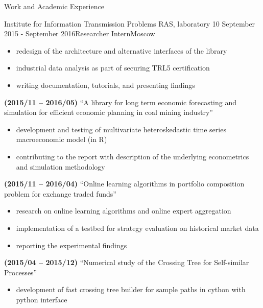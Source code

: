 \documentclass{resume} %
\begin{document}
\begin{rSection}{Work and Academic Experience}
\begin{rSubsection}{
        Institute for Information Transmission Problems RAS, laboratory 10
    }{September 2015 - September 2016}{Researcher Intern}{Moscow}
\begin{itemize}
        \item redesign of the architecture and alternative interfaces of the library

        \item industrial data analysis as part of securing TRL5 certification

        \item writing documentation, tutorials, and presenting findings
    \end{itemize}

    \item \textbf{(2015/11 -- 2016/05)}
    ``A library for long term economic forecasting and simulation for efficient economic planning in coal mining industry''
    \begin{itemize}
        \item development and testing of multivariate heteroskedastic time series macroeconomic model (in R)

        \item contributing to the report with description of the underlying econometrics and simulation methodology
    \end{itemize}

    \item \textbf{(2015/11 -- 2016/04)}
    ``Online learning algorithms in portfolio composition problem for exchange traded funds''
    \begin{itemize}
        \item research on online learning algorithms and online expert aggregation

        \item implementation of a testbed for strategy evaluation on historical market data

        \item reporting the experimental findings
    \end{itemize}

    \item \textbf{(2015/04 -- 2015/12)}
    ``Numerical study of the Crossing Tree for Self-similar Processes''
    \begin{itemize}
        \item development of fast crossing tree builder for sample paths in cython with python interface


\end{itemize}
\end{rSubsection}
\end{rSection}
\end{document}

